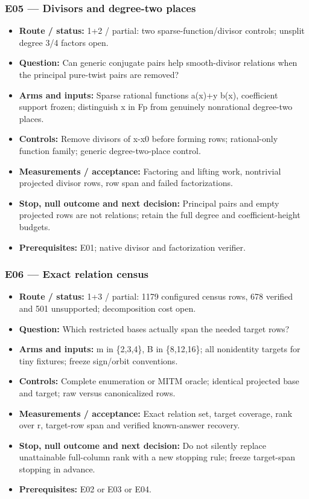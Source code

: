 \documentclass[
  10pt,
]{article}
\providecommand{\tightlist}{%
  \setlength{\itemsep}{0pt}\setlength{\parskip}{0pt}}
\begin{document}
\subsubsection{E05 --- Divisors and degree-two
places}\label{e05-divisors-and-degree-two-places}

\begin{itemize}
\tightlist
\item
  \textbf{Route / status:} 1+2 / partial: two sparse-function/divisor
  controls; unsplit degree 3/4 factors open.
\item
  \textbf{Question:} Can generic conjugate pairs help smooth-divisor
  relations when the principal pure-twist pairs are removed?
\item
  \textbf{Arms and inputs:} Sparse rational functions a(x)+y b(x),
  coefficient support frozen; distinguish x in Fp from genuinely
  nonrational degree-two places.
\item
  \textbf{Controls:} Remove divisors of x-x0 before forming rows;
  rational-only function family; generic degree-two-place control.
\item
  \textbf{Measurements / acceptance:} Factoring and lifting work,
  nontrivial projected divisor rows, row span and failed factorizations.
\item
  \textbf{Stop, null outcome and next decision:} Principal pairs and
  empty projected rows are not relations; retain the full degree and
  coefficient-height budgets.
\item
  \textbf{Prerequisites:} E01; native divisor and factorization
  verifier.
\end{itemize}

\subsubsection{E06 --- Exact relation
census}\label{e06-exact-relation-census}

\begin{itemize}
\tightlist
\item
  \textbf{Route / status:} 1+3 / partial: 1179 configured census rows,
  678 verified and 501 unsupported; decomposition cost open.
\item
  \textbf{Question:} Which restricted bases actually span the needed
  target rows?
\item
  \textbf{Arms and inputs:} m in \{2,3,4\}, B in \{8,12,16\}; all
  nonidentity targets for tiny fixtures; freeze sign/orbit conventions.
\item
  \textbf{Controls:} Complete enumeration or MITM oracle; identical
  projected base and target; raw versus canonicalized rows.
\item
  \textbf{Measurements / acceptance:} Exact relation set, target
  coverage, rank over r, target-row span and verified known-answer
  recovery.
\item
  \textbf{Stop, null outcome and next decision:} Do not silently replace
  unattainable full-column rank with a new stopping rule; freeze
  target-span stopping in advance.
\item
  \textbf{Prerequisites:} E02 or E03 or E04.
\end{itemize}
\end{document}
